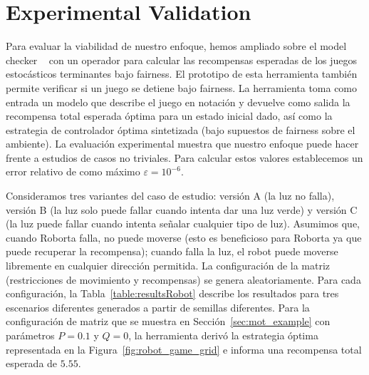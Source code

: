 \section{Experimental Validation} \label{sec:experimental_eval}


Para evaluar la viabilidad de nuestro enfoque, hemos ampliado sobre el model checker {\Prism}~\cite{DBLP:conf/cav/KwiatkowskaN0S20,DBLP:conf/cav/KwiatkowskaNP11} con un operador para calcular las recompensas esperadas de los juegos estocásticos terminantes bajo fairness. El prototipo de esta herramienta también permite verificar si un juego se detiene bajo fairness.
La herramienta toma como entrada un modelo que describe el juego en notación {\Prism} y devuelve como salida
la recompensa total esperada óptima para un estado inicial dado, así como la estrategia de controlador óptima sintetizada (bajo supuestos de fairness sobre el ambiente).
La evaluación experimental muestra que nuestro enfoque puede hacer frente a estudios de casos no triviales. Para calcular estos valores establecemos un error relativo de como máximo $\varepsilon = 10^{-6}$.



Consideramos tres variantes del caso de estudio: versión A (la luz no falla), versión B (la luz solo puede fallar cuando intenta dar una luz verde) y versión C (la luz puede fallar cuando intenta señalar cualquier tipo de luz).
Asumimos que, cuando Roborta falla, no puede moverse (esto es beneficioso para Roborta ya que puede recuperar la recompensa);
cuando falla la luz, el robot puede moverse libremente en cualquier dirección permitida.
La configuración de la matriz (restricciones de movimiento y recompensas) se genera aleatoriamente. Para cada configuración, la Tabla~\ref{table:resultsRobot} describe los resultados para tres escenarios diferentes generados a partir de semillas diferentes. Para la configuración de matriz que se muestra en Sección~\ref{sec:mot_example} con parámetros $P=0.1$ y $Q=0$, la herramienta derivó la estrategia óptima representada en la Figura~\ref{fig:robot_game_grid} e informa una recompensa total esperada de $5.55$.


